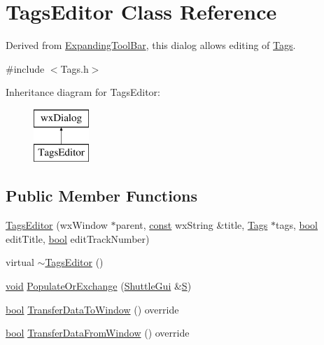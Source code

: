 \hypertarget{class_tags_editor}{}\section{Tags\+Editor Class Reference}
\label{class_tags_editor}


Derived from \hyperlink{class_expanding_tool_bar}{Expanding\+Tool\+Bar}, this dialog allows editing of \hyperlink{class_tags}{Tags}.  




{\ttfamily \#include $<$Tags.\+h$>$}

Inheritance diagram for Tags\+Editor\+:\begin{figure}[H]
\begin{center}
\leavevmode
\includegraphics[height=2.000000cm]{class_tags_editor}
\end{center}
\end{figure}
\subsection*{Public Member Functions}
\begin{DoxyCompactItemize}
\item 
\hyperlink{class_tags_editor_afea95ff819d3c04c0ffa182529ee4166}{Tags\+Editor} (wx\+Window $\ast$parent, \hyperlink{getopt1_8c_a2c212835823e3c54a8ab6d95c652660e}{const} wx\+String \&title, \hyperlink{class_tags}{Tags} $\ast$tags, \hyperlink{mac_2config_2i386_2lib-src_2libsoxr_2soxr-config_8h_abb452686968e48b67397da5f97445f5b}{bool} edit\+Title, \hyperlink{mac_2config_2i386_2lib-src_2libsoxr_2soxr-config_8h_abb452686968e48b67397da5f97445f5b}{bool} edit\+Track\+Number)
\item 
virtual \hyperlink{class_tags_editor_ad31bc81a020e2f5f3b51940faae5764c}{$\sim$\+Tags\+Editor} ()
\item 
\hyperlink{sound_8c_ae35f5844602719cf66324f4de2a658b3}{void} \hyperlink{class_tags_editor_a08854abbe5a094ac950fc7ebb001ff2a}{Populate\+Or\+Exchange} (\hyperlink{class_shuttle_gui}{Shuttle\+Gui} \&\hyperlink{xlftab_8c_af933676109efed7ab34cea71d748a517}{S})
\item 
\hyperlink{mac_2config_2i386_2lib-src_2libsoxr_2soxr-config_8h_abb452686968e48b67397da5f97445f5b}{bool} \hyperlink{class_tags_editor_adf2f416d95ee5fcbd8c79cef121b2e46}{Transfer\+Data\+To\+Window} () override
\item 
\hyperlink{mac_2config_2i386_2lib-src_2libsoxr_2soxr-config_8h_abb452686968e48b67397da5f97445f5b}{bool} \hyperlink{class_tags_editor_a2af267d7d0016184c6cfd1f6ee81283f}{Transfer\+Data\+From\+Window} () override
\end{DoxyCompactItemize}



